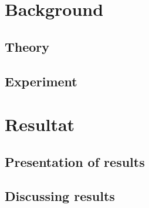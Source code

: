 \documentclass[10pt,a4paper]{article}
\begin{document}
\newpage

\section{Background}

\subsection{Theory}

\subsection{Experiment}

\newpage

\section{Resultat}

\subsection{Presentation of results}

\subsection{Discussing results}
\end{document}
